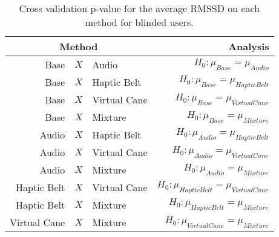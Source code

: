 
\begin{table}[!htb]
\centering
\caption{Cross validation p-value for the average RMSSD on each method for blinded users.}
\label{tab:lsd_average_RMSSD}
\begin{tabular}{rclr}
\toprule
      \multicolumn{3}{c}{Method} &                                       Analysis \\
\midrule
              Base & $X$ & Audio &               $H_0 : \mu_{Base} = \mu_{Audio}$ \\
        Base & $X$ & Haptic Belt &         $H_0 : \mu_{Base} = \mu_{Haptic Belt}$ \\
       Base & $X$ & Virtual Cane &        $H_0 : \mu_{Base} = \mu_{Virtual Cane}$ \\
            Base & $X$ & Mixture &             $H_0 : \mu_{Base} = \mu_{Mixture}$ \\
       Audio & $X$ & Haptic Belt &        $H_0 : \mu_{Audio} = \mu_{Haptic Belt}$ \\
      Audio & $X$ & Virtual Cane &       $H_0 : \mu_{Audio} = \mu_{Virtual Cane}$ \\
           Audio & $X$ & Mixture &            $H_0 : \mu_{Audio} = \mu_{Mixture}$ \\
Haptic Belt & $X$ & Virtual Cane & $H_0 : \mu_{Haptic Belt} = \mu_{Virtual Cane}$ \\
     Haptic Belt & $X$ & Mixture &      $H_0 : \mu_{Haptic Belt} = \mu_{Mixture}$ \\
    Virtual Cane & $X$ & Mixture &     $H_0 : \mu_{Virtual Cane} = \mu_{Mixture}$ \\
\bottomrule
\end{tabular}
\end{table}

